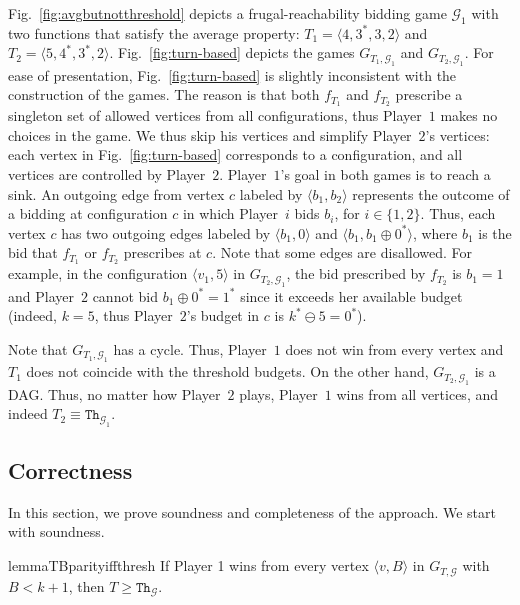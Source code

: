 \documentclass{article}\providecommand{\nequiv}{\not\equiv}\usepackage[a4paper,margin=20mm]{geometry}
\newcommand{\PO}{Player~$1$\xspace}
\newcommand{\PT}{Player~$2$\xspace}
\newcommand{\PLi}{Player~$i$\xspace}
\newcommand{\G}{{\mathcal G}}
\newcommand{\thresh}{\texttt{Th}\xspace}
\newcommand{\zug}[1]{\langle #1  \rangle}
\renewcommand{\set}[1]{\{ #1  \}}
\newcommand{\succb}[1]{#1 \oplus 0^*\xspace}
\begin{document}
\begin{example}
Fig.~\ref{fig:avgbutnotthreshold} depicts a frugal-reachability bidding game \(\G_1\) with two functions that satisfy the average property: \(T_1 = \zug{4,3^*, 3, 2}\) and \(T_2 = \zug{5,4^*, 3^*, 2}\). 
Fig.~\ref{fig:turn-based} depicts the games $G_{T_1, \G_1}$ and $G_{T_2, \G_1}$. For ease of presentation, Fig.~\ref{fig:turn-based} is slightly inconsistent with the construction of the games. 
The reason is that both $f_{T_1}$ and $f_{T_2}$ prescribe a singleton set of allowed vertices from all configurations, thus \PO makes no choices in the game. We thus skip his vertices and simplify \PT's vertices: each vertex in Fig.~\ref{fig:turn-based} corresponds to a configuration, and all vertices are controlled by \PT. \PO's goal in both games is to reach a sink.  An outgoing edge from vertex $c$ labeled by $\zug{b_1, b_2}$ represents the outcome of a bidding at configuration $c$ in which \PLi bids $b_i$, for $i \in \set{1,2}$. Thus, each vertex $c$ has two outgoing edges labeled by $\zug{b_1, 0}$ and $\zug{b_1, \succb{b_1}}$, where $b_1$ is the bid that $f_{T_1}$ or $f_{T_2}$ prescribes at $c$. Note that some edges are disallowed. For example, in the configuration $\zug{v_1, 5}$ in $G_{T_2, \G_1}$, the bid prescribed by $f_{T_2}$ is $b_1 = 1$ and \PT cannot bid $\succb{b_1} = 1^*$ since it exceeds her available budget (indeed, $k=5$, thus \PT's budget in $c$ is $k^* \ominus 5 = 0^*$). 

Note that \(G_{T_1, \G_1}\) has a cycle. Thus, \PO does not win from every vertex and $T_1$ does not coincide with the threshold budgets. On the other hand, \(G_{T_2, \G_1}\) is a DAG. Thus, no matter how \PT plays, \PO wins from all vertices, and indeed \(T_2 \equiv \thresh_{\G_1}\).
\end{example}


\subsection{Correctness}
In this section, we prove soundness and completeness of the approach. We start with soundness.


\begin{restatable}{lemma}{TBparityiffthresh}
	\label{lemma:TBparity-iff-thresh}
	If Player 1 wins from every vertex $\zug{v,B}$ in $G_{T, \G}$ with $B < k+1$, then $T \geq \thresh_\G$. 
\end{restatable}
\end{document}
